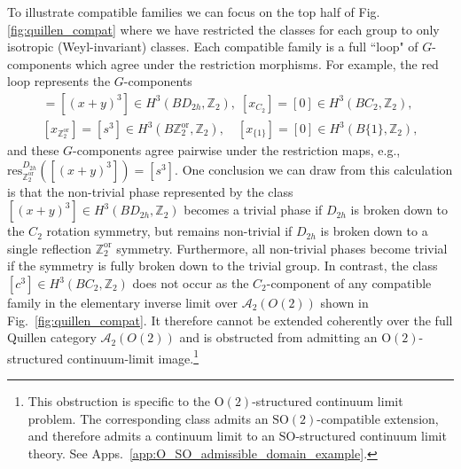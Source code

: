 \documentclass[aps,prx,reprint,superscriptaddress,twocolumn,amsmath,amssymb,amsfonts, nofootinbib]{revtex4-2}
\newcommand{\qa}{\mathcal{A}_{2}}
\newcommand{\res}{\text{res}}
\newcommand{\Z}{\mathbb{Z}}
\theoremstyle{apsstyle}
\begin{document}
\medskip 


To illustrate compatible families we can focus on the top half of Fig. \ref{fig:quillen_compat} where we have restricted the classes for each group to only isotropic (Weyl-invariant) classes. Each compatible family is a full ``loop" of $G$-components which agree under the restriction morphisms.  For example, the red loop represents the $G$-components 
\begin{gather*}
[x_{D_{2h}}]=[(x+y)^3]\in H^{3}(BD_{2h}, \Z_{2}),\;
[x_{C_2}]=[0]\in H^{3}(BC_{2}, \Z_{2}),\\
[x_{\Z_2^{\mathrm{or}}}]=[s^3]\in H^{3}(B\Z_2^{\mathrm{or}}, \Z_{2}), \quad [x_{\{1\}}]=[0]\in H^{3}(B\{1\}, \Z_{2}),
\end{gather*}
and these $G$-components agree pairwise under the restriction maps, e.g., $\res^{D_{2h}}_{\mathbb{Z}_{2}^{\mathrm{or}}}([(x+y)^{3}]) = [s^{3}]$. One conclusion we can draw from this calculation is that the non-trivial phase represented by the class $[(x+y)^3]\in H^{3}(BD_{2h}, \Z_{2})$ becomes a trivial phase if $D_{2h}$ is broken down to the $C_{2}$ rotation symmetry, but remains non-trivial if $D_{2h}$ is broken down to a single reflection $\Z_{2}^{\mathrm{or}}$ symmetry. Furthermore, all non-trivial phases become trivial if the symmetry is fully broken down to the trivial group. In contrast, the class $[c^{3}]\in H^{3}(BC_{2},\Z_{2})$ does not occur as the $C_{2}$-component of any compatible family in the elementary inverse limit over $\qa(O(2))$ shown in Fig.~\ref{fig:quillen_compat}. It therefore cannot be extended coherently over the full Quillen category $\qa(O(2))$ and is obstructed from admitting an $\mathrm O(2)$-structured continuum-limit image.\footnote{This obstruction is specific to the $\mathrm O(2)$-structured continuum limit problem. The corresponding class admits an $\mathrm{SO}(2)$-compatible extension, and therefore admits a continuum limit to an $\mathrm{SO}$-structured continuum limit theory. See Apps.~\ref{app:O_SO_admissible_domain_example}.}
\end{document}

